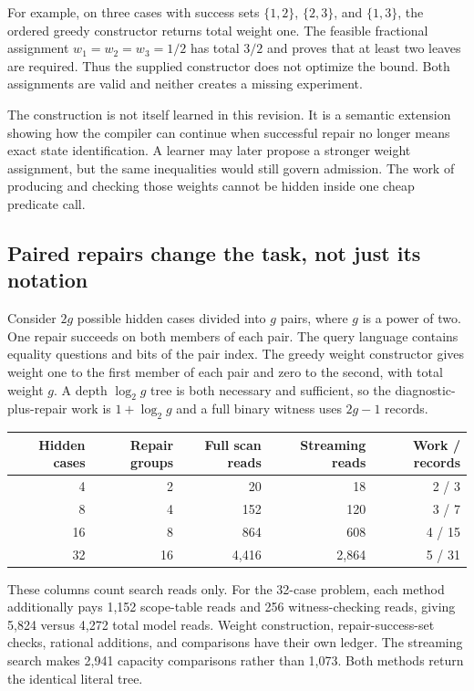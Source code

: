 For example, on three cases with success sets $\{1,2\}$, $\{2,3\}$, and $\{1,3\}$, the ordered greedy constructor returns total weight one. The feasible fractional assignment $w_1=w_2=w_3=1/2$ has total $3/2$ and proves that at least two leaves are required. Thus the supplied constructor does not optimize the bound. Both assignments are valid and neither creates a missing experiment.

The construction is not itself learned in this revision. It is a semantic extension showing how the compiler can continue when successful repair no longer means exact state identification. A learner may later propose a stronger weight assignment, but the same inequalities would still govern admission. The work of producing and checking those weights cannot be hidden inside one cheap predicate call.

\subsection{Paired repairs change the task, not just its notation}
Consider $2g$ possible hidden cases divided into $g$ pairs, where $g$ is a power of two. One repair succeeds on both members of each pair. The query language contains equality questions and bits of the pair index. The greedy weight constructor gives weight one to the first member of each pair and zero to the second, with total weight $g$. A depth $\log_2g$ tree is both necessary and sufficient, so the diagnostic-plus-repair work is $1+\log_2g$ and a full binary witness uses $2g-1$ records.

\begin{center}\small
\begin{tabular}{@{}rrrrr@{}}\toprule
Hidden cases & Repair groups & Full scan reads & Streaming reads & Work / records\\\midrule
4 & 2 & 20 & 18 & 2 / 3\\
8 & 4 & 152 & 120 & 3 / 7\\
16 & 8 & 864 & 608 & 4 / 15\\
32 & 16 & 4,416 & 2,864 & 5 / 31\\\bottomrule
\end{tabular}
\end{center}

These columns count search reads only. For the 32-case problem, each method additionally pays 1,152 scope-table reads and 256 witness-checking reads, giving 5,824 versus 4,272 total model reads. Weight construction, repair-success-set checks, rational additions, and comparisons have their own ledger. The streaming search makes 2,941 capacity comparisons rather than 1,073. Both methods return the identical literal tree.

